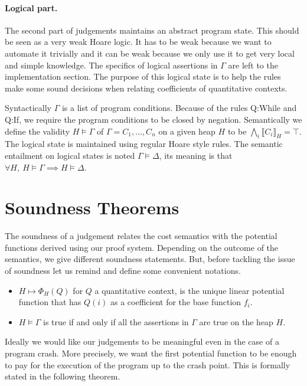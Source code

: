 \documentclass[nocopyrightspace,preprint]{sigplanconf}
\begin{document}
\paragraph{Logical part.}
The second part of judgements maintains an abstract program state.
This should be seen as a very weak Hoare logic.  It has to be weak because
we want to automate it trivially and it can be weak because we only use
it to get very local and simple knowledge.  The specifics of logical assertions
in $\Gamma$ are left to the implementation section.
%
The purpose of this logical state is to help the rules
make some sound decisions when relating coefficients of quantitative
contexts.

Syntactically $\Gamma$ is a list of program conditions.  Because of the
rules {\sc Q:While} and {\sc Q:If}, we require the program conditions
to be closed by negation.  Semantically we define the validity
$H \models \Gamma$ of $\Gamma = C_1, \dots, C_n$ on a given
heap $H$ to be $\bigwedge_i \llbracket C_i \rrbracket_H = \top$.
%
The logical state
is maintained using regular Hoare style rules.
The semantic entailment on logical states is noted $\Gamma \models \Delta$,
its meaning is that $\forall H,~ H\models\Gamma \implies H\models\Delta$.


\section{Soundness Theorems}

The soundness of a judgement relates the cost semantics with the potential
functions derived using our proof system.  Depending on the outcome of
the semantics, we give different soundness statements.
But, before tackling the issue of soundness let us remind and define some
convenient notations.
\begin{itemize}
\item $H \mapsto \Phi_H(Q)$ for $Q$ a quantitative context, is the
unique linear potential function that has $Q(i)$ as a coefficient for the
base function $f_i$.
\item $H \models \Gamma$ is true if and only if all the assertions in
$\Gamma$ are true on the heap $H$.
\end{itemize}

Ideally we would
like our judgements to be meaningful even in the case of a program
crash.  More precisely, we want the first potential function to be enough
to pay for the execution of the program up to the crash point.  This is
formally stated in the following theorem.
\end{document}
